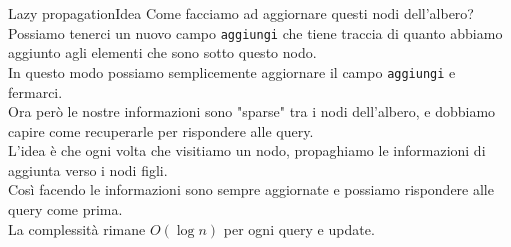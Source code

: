 \documentclass[compress]{beamer}
\begin{document}
\begin{frame}{Lazy propagation}{Idea}
    Come facciamo ad aggiornare questi nodi dell'albero?\\
    \pause
    Possiamo tenerci un nuovo campo \texttt{aggiungi} che tiene traccia di quanto abbiamo aggiunto agli elementi 
    che sono sotto questo nodo.\\
    \pause
    In questo modo possiamo semplicemente aggiornare il campo \texttt{aggiungi} e fermarci.\\
    \pause
    Ora però le nostre informazioni sono "sparse" tra i nodi dell'albero, e dobbiamo capire come recuperarle per rispondere 
    alle query.\\
    \pause
    L'idea è che ogni volta che visitiamo un nodo, propaghiamo le informazioni di aggiunta verso i nodi figli.\\
    \pause
    Così facendo le informazioni sono sempre aggiornate e possiamo rispondere alle query come prima.\\
    \pause
    La complessità rimane $O(\log n)$ per ogni query e update.
\end{frame}
\begin{frame}{}
\end{frame}

\begin{frame}{}
\end{frame}
\end{document}
